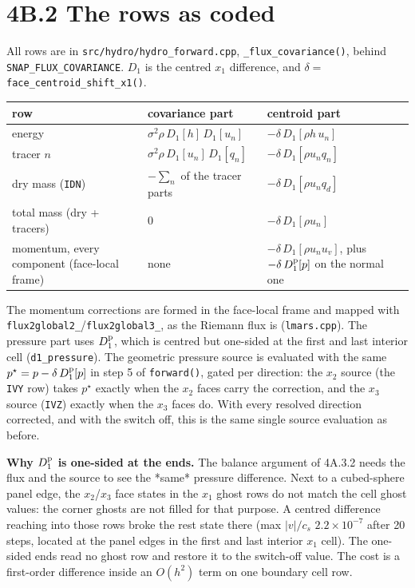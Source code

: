 \documentclass[11pt,a4paper]{article}
\begin{document}
\section*{4B.2 The rows as coded}

All rows are in \texttt{src/hydro/hydro\_forward.cpp}, \texttt{\_flux\_covariance()}, behind
\texttt{SNAP\_FLUX\_COVARIANCE}. $D_1$ is the centred $x_1$ difference, and
$\delta=$ \texttt{face\_centroid\_shift\_x1()}.

\begin{longtable}{lll}
\toprule
row & covariance part & centroid part \\
\midrule
energy & $\sigma^2\rho\,D_1[h]\,D_1[u_n]$ & $-\delta\,D_1[\rho h\,u_n]$ \\
tracer $n$ & $\sigma^2\rho\,D_1[u_n]\,D_1[q_n]$ & $-\delta\,D_1[\rho u_n q_n]$ \\
dry mass (\texttt{IDN}) & $-\sum_n$ of the tracer parts & $-\delta\,D_1[\rho u_n q_d]$ \\
total mass (dry + tracers) & $0$ & $-\delta\,D_1[\rho u_n]$ \\
momentum, every component (face-local frame) & none & $-\delta\,D_1[\rho u_n u_v]$, plus $-\delta\,D_1^{\rm p}[p]$ on the normal one \\
\bottomrule
\end{longtable}

The momentum corrections are formed in the face-local frame and mapped with
\texttt{flux2global2\_}/\texttt{flux2global3\_}, as the Riemann flux is (\texttt{lmars.cpp}). The
pressure part uses $D_1^{\rm p}$, which is centred but one-sided at the first and
last interior cell (\texttt{d1\_pressure}). The geometric pressure source is evaluated
with the same $p^\star=p-\delta\,D_1^{\rm p}[p]$ in step 5 of \texttt{forward()}, gated
per direction: the $x_2$ source (the \texttt{IVY} row) takes $p^\star$ exactly when the
$x_2$ faces carry the correction, and the $x_3$ source (\texttt{IVZ}) exactly when the
$x_3$ faces do. With every resolved direction corrected, and with the switch
off, this is the same single source evaluation as before.

\textbf{Why $D_1^{\rm p}$ is one-sided at the ends.} The balance argument of 4A.3.2
needs the flux and the source to see the *same* pressure difference. Next to a
cubed-sphere panel edge, the $x_2$/$x_3$ face states in the $x_1$ ghost rows do not
match the cell ghost values: the corner ghosts are not filled for that purpose.
A centred difference reaching into those rows broke the rest state there
(max $|v|/c_s$ $2.2\times10^{-7}$ after 20 steps, located at the panel edges in the
first and last interior $x_1$ cell). The one-sided ends read no ghost row and
restore it to the switch-off value. The cost is a first-order difference inside
an $O(h^2)$ term on one boundary cell row.
\end{document}
